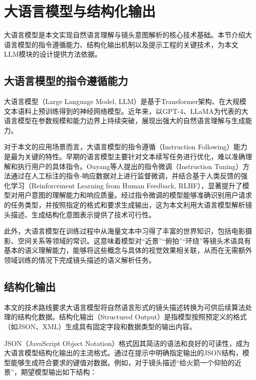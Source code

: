 \section{大语言模型与结构化输出}

大语言模型是本文实现自然语言理解与镜头意图解析的核心技术基础。本节介绍大语言模型的指令遵循能力、结构化输出机制以及提示工程的关键技术，为本文LLM模块的设计提供方法依据。

\subsection{大语言模型的指令遵循能力}

大语言模型（Large Language Model, LLM）是基于Transformer架构\cite{vaswani2017attention}、在大规模文本语料上预训练得到的神经网络模型。近年来，以GPT-4\cite{openai2023gpt4}、LLaMA\cite{touvron2023llama,touvron2023llama2}为代表的大语言模型在参数规模和能力边界上持续突破，展现出强大的自然语言理解与生成能力。

对于本文的应用场景而言，大语言模型的指令遵循（Instruction Following）能力是最为关键的特性。早期的语言模型主要针对文本续写任务进行优化，难以准确理解和执行用户的具体指令。Ouyang等人\cite{ouyang2022training}提出的指令微调（Instruction Tuning）方法通过在人工标注的指令-响应数据对上进行监督微调，并结合基于人类反馈的强化学习（Reinforcement Learning from Human Feedback, RLHF），显著提升了模型对用户意图的理解能力和响应质量。经过指令微调的模型能够准确识别用户请求的任务类型，并按照指定的格式和要求生成输出，这为本文利用大语言模型解析镜头描述、生成结构化意图表示提供了技术可行性。

此外，大语言模型在训练过程中从海量文本中习得了丰富的世界知识，包括电影摄影、空间关系等领域的常识。这意味着模型对“近景”“俯拍”“环绕”等镜头术语具有基本的语义理解能力，能够将这些概念与具体的视觉效果相关联，从而在无需额外领域训练的情况下完成镜头描述的语义解析任务。

\subsection{结构化输出}

本文的技术路线要求大语言模型将自然语言形式的镜头描述转换为可供后续算法处理的结构化数据。结构化输出（Structured Output）是指模型按照预定义的格式（如JSON、XML）生成具有固定字段和数据类型的输出内容\cite{geng2025jsonschemabench}。

JSON（JavaScript Object Notation）格式因其简洁的语法和良好的可读性，成为大语言模型结构化输出的主流格式。通过在提示中明确指定输出的JSON结构，模型能够生成符合要求的键值对数据。例如，对于镜头描述“给火箭一个仰拍的近景”，期望模型输出如下结构：

